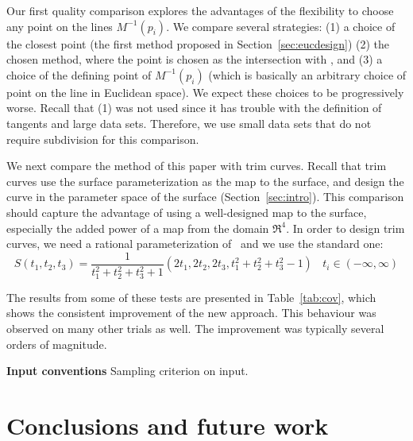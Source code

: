 Our first quality comparison explores the advantages of the flexibility 
to choose any point on the lines $M^{-1}(p_i)$.
We compare several strategies:
(1) a choice of the closest point (the first method proposed in
Section~\ref{sec:eucdesign})
(2) the chosen method, where the point is chosen as the intersection with
, and
(3) a choice of the defining point of $M^{-1}(p_i)$ (which is basically
an arbitrary choice of point on the line in Euclidean space).
We expect these choices to be progressively worse.
Recall that (1) was not used since it has trouble with the definition
of tangents and large data sets.
Therefore, we use small data sets that do not require subdivision
for this comparison.

We next compare the method of this paper with trim curves.
Recall that trim curves use the surface parameterization as the map
to the surface, and design the curve in the 
parameter space of the surface (Section~\ref{sec:intro}).
This comparison should capture the advantage of using a well-designed map to the
surface, especially the added power of a map from the domain $\Re^4$.
In order to design trim curves, we need a rational parameterization 
of \ and we use the standard one:
\begin{equation}
\label{Snparam}
	S(t_1,t_2,t_3) = 
	\frac{1}{t_1^2 + t_2^2 + t_3^2 + 1} 
	(2t_1, 2t_2, 2t_3, t_1^2 + t_2^2 + t_3^2 - 1) \ \ \ \ t_i \in (-\infty,\infty)
\end{equation}



The results from some of these tests are presented in Table~\ref{tab:cov},
which shows the consistent improvement of the new approach.
This behaviour was observed on many other trials as well.
The improvement was typically several orders of magnitude.

\begin{table}
\label{tab:cov}
\end{table}

{\bf Input conventions}
Sampling criterion on input.  %

\section{Conclusions and future work}

